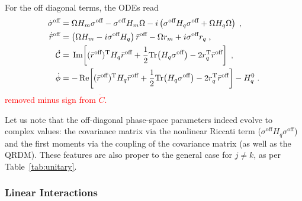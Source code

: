 \documentclass[%
reprint,
superscriptaddress,
nofootinbib,
 amsmath,amssymb,
prx,
floatfix,
]{revtex4-2}
\begin{document}
For the off diagonal terms, the ODEs read
\begin{align}
\label{eq:general_unitary_ODE_off}
     \dot{\sigma}^{\text{off}} &=   \Omega  H_m  \sigma^{\text{off}} -  \sigma^{\text{off}}    H_m   \Omega   -   i  \left(  \sigma^{\text{off}} H_q \sigma^{\text{off}}  + \Omega H_q  \Omega \right) \;, \nonumber \\
     \dot{\bar{r}}^{\text{off}} &=  \left( \Omega  H_m  -  i   \sigma^{\text{off}} H_q \right) \bar{r}^{\text{off}}   -  \Omega r_m + i \sigma^{\text{off}} r_q \;,   \\
     \dot{\mathcal{C}} &= \,\text{Im}\!\left[ (\bar{r}^{\text{off}})^{\rm T} H_q \bar{r}^{\text{off}} + \frac{1}{2}\text{Tr}\!\left(H_q \sigma^{\text{off}}\right)  - 2 r_q^{\rm T} \bar{r}^{\text{off}} \right] \;, \nonumber \\
     \dot{\phi} &= -\,\text{Re}\!\left[ (\bar{r}^{\text{off}})^{\rm T} H_q \bar{r}^{\text{off}} + \frac{1}{2}\text{Tr}\!\left(H_q \sigma^{\text{off}}\right)  - 2 r_q^{\rm T} \bar{r}^{\text{off}} \right] - H_q^0 \;. \nonumber
\end{align}
\textcolor{red}{removed minus sign from $\dot{C}$.}

Let us note that the off-diagonal phase-space parameters indeed evolve to complex values: the covariance matrix via the nonlinear Riccati term ($\sigma^{\text{off}} H_q \sigma^{\text{off}}$) and the first moments via the coupling of the covariance matrix (as well as the QRDM). These features are also proper to the general case for $j\neq k$, as per Table~\ref{tab:unitary}.  %



\subsubsection{Linear Interactions \label{subsec:force}}
\end{document}

